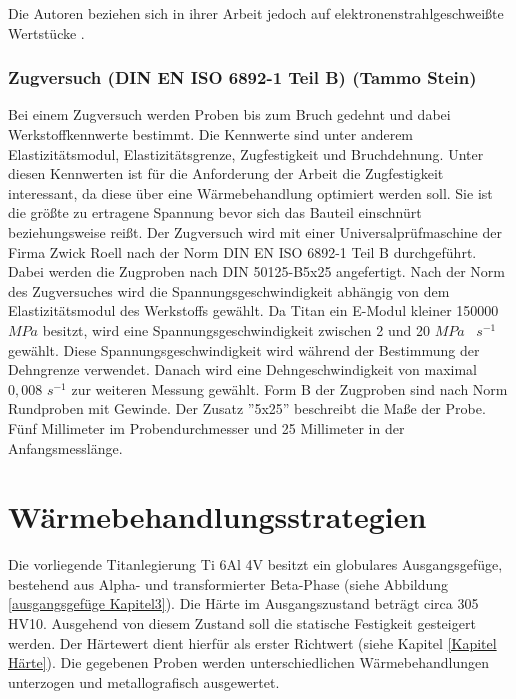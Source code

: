 \documentclass[a4paper, 11pt]{tubsreprt}
\begin{document}
Die Autoren beziehen sich in ihrer Arbeit jedoch auf elektronenstrahlgeschweißte Wertstücke \cite{Shi2013}.
\subsection{Zugversuch (DIN EN ISO 6892-1 Teil B) (Tammo Stein)}
\label{Kapitel Zugversuch}
Bei einem Zugversuch werden Proben bis zum Bruch gedehnt und dabei Werkstoffkennwerte bestimmt. Die Kennwerte sind unter anderem  Elastizitätsmodul, Elastizitätsgrenze, Zugfestigkeit und Bruchdehnung. Unter diesen Kennwerten ist für die Anforderung der Arbeit die Zugfestigkeit interessant, da diese über eine Wärmebehandlung optimiert werden soll. Sie ist die größte zu ertragene Spannung bevor sich das Bauteil einschnürt beziehungsweise reißt. Der Zugversuch wird mit einer Universalprüfmaschine der Firma Zwick Roell nach der Norm DIN EN ISO 6892-1 Teil B durchgeführt. Dabei werden die Zugproben nach DIN 50125-B5x25 angefertigt. Nach der Norm des Zugversuches wird die Spannungsgeschwindigkeit abhängig von dem Elastizitätsmodul des Werkstoffs gewählt. Da Titan ein E-Modul kleiner 150000 $MPa$ besitzt, wird eine Spannungsgeschwindigkeit zwischen 2 und 20 $MPa$~ $s^{-1}$ gewählt. Diese Spannungsgeschwindigkeit wird während der Bestimmung der Dehngrenze verwendet. Danach wird eine Dehngeschwindigkeit von maximal $0,008$ $s^{-1}$ zur weiteren Messung gewählt. Form B der Zugproben sind nach Norm Rundproben mit Gewinde. Der Zusatz ''5x25'' beschreibt die Maße der Probe. Fünf Millimeter im Probendurchmesser und 25 Millimeter in der Anfangsmesslänge.



\chapter{Wärmebehandlungsstrategien}
Die vorliegende Titanlegierung Ti 6Al 4V besitzt ein globulares Ausgangsgefüge, bestehend aus Alpha- und transformierter Beta-Phase (siehe Abbildung \ref{ausgangsgefüge Kapitel3}). Die Härte im Ausgangszustand beträgt circa 305 HV10. Ausgehend von diesem Zustand soll die statische Festigkeit gesteigert werden. Der Härtewert dient hierfür als erster Richtwert (siehe Kapitel \ref{Kapitel Härte}). Die gegebenen Proben werden unterschiedlichen Wärmebehandlungen unterzogen und metallografisch ausgewertet. 
\end{document}

